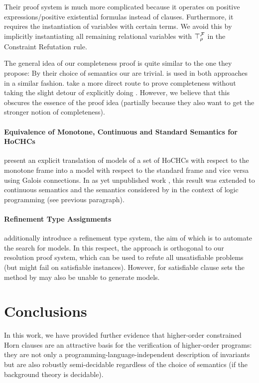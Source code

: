 \documentclass[a4paper,twoside,notitlepage,openright,11pt]{report}
\begin{document}
Their proof system is much more complicated because it operates on positive expressions/positive existential formulas instead of clauses. Furthermore, it requires the instantiation of variables with certain terms. We avoid this by implicitly instantiating all remaining relational variables with $\top_\rho^\mathcal F$ in the Constraint Refutation rule.

The general idea of our completeness proof is quite similar to the one they propose: By their choice of semantics our  are trivial.  is used in both approaches in a similar fashion. \cite{CHRW13} take a more direct route to prove completeness without taking the slight detour of explicitly doing . However, we believe that this obscures the essence of the proof idea (partially because they also want to get the stronger notion of completeness).

\paragraph{Equivalence of Monotone, Continuous and Standard Semantics for HoCHCs}
\cite{BOR18} present an explicit translation of models of a set of HoCHCs with respect to the monotone frame into a model with respect to the standard frame and vice versa using Galois connections. In as yet unpublished work \cite{J18}, this result was extended to continuous semantics and the semantics considered by \cite{CHRW13} in the context of logic programming (see previous paragraph).

\paragraph{Refinement Type Assignments}
\cite{BOR18} additionally introduce a refinement type system, the aim of which is to automate the search for models. In this respect, the approach is orthogonal to our resolution proof system, which can be used to refute all unsatisfiable problems (but might fail on satisfiable instances). However, for satisfiable clause sets the method by \cite{BOR18} may also be unable to generate models.

\section{Conclusions}
In this work, we have provided further evidence that higher-order constrained Horn clauses are an attractive basis for the verification of higher-order programs: 
they are not only a programming-language-independent description of invariants but are also robustly semi-decidable regardless of the choice of semantics (if the background theory is decidable).
\end{document}
